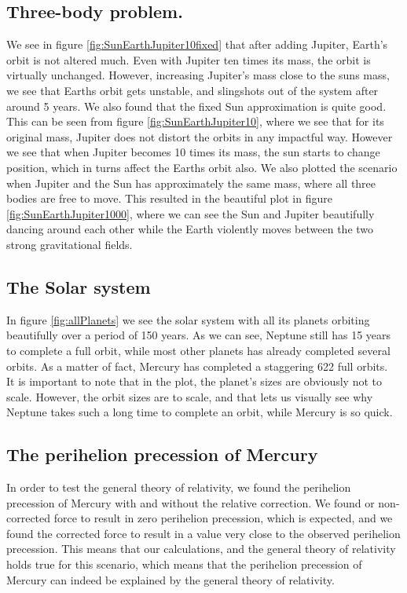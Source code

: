 \documentclass[../main.tex]{subfiles}
\begin{document}
\subsection{Three-body problem.}
We see in figure \ref{fig:SunEarthJupiter10fixed} that after adding Jupiter, Earth's orbit is not altered much. Even with Jupiter ten times its mass, the orbit is virtually unchanged. However, increasing Jupiter's mass close to the suns mass, we see that Earths orbit gets unstable, and slingshots out of the system after around 5 years.
We also found that the fixed Sun approximation is quite good. This can be seen from figure \ref{fig:SunEarthJupiter10}, where we see that for its original mass, Jupiter does not distort the orbits in any impactful way. However we see that when Jupiter becomes 10 times its mass, the sun starts to change position, which in turns affect the Earths orbit also. We also plotted the scenario when Jupiter and the Sun has approximately the same mass, where all three bodies are free to move. This resulted in the beautiful plot in figure \ref{fig:SunEarthJupiter1000}, where we can see the Sun and Jupiter beautifully dancing around each other while the Earth violently moves between the two strong gravitational fields.

\subsection{The Solar system}
In figure \ref{fig:allPlanets} we see the solar system with all its planets orbiting beautifully over a period of 150 years. As we can see, Neptune still has 15 years to complete a full orbit, while most other planets has already completed several orbits. As a matter of fact, Mercury has completed a staggering 622 full orbits. \\
It is important to note that in the plot, the planet's sizes are obviously not to scale. However, the orbit sizes are to scale, and that lets us visually see why Neptune takes such a long time to complete an orbit, while Mercury is so quick.
\iffalse
When making a simulation of the different planets in our Solar system, it would be strange if we did not look at the whole system together. The orbit of all the planets in The Solar system is plotted in figure \ref{fig:allPlanets}. As expected(studied in real life) they all move around the Sun in a somewhat circular/elliptical orbit during our simulation.
\fi

\subsection{The perihelion precession of Mercury}
In order to test the general theory of relativity, we found the perihelion precession of Mercury with and without the relative correction. We found or non-corrected force to result in zero perihelion precession, which is expected, and we found the corrected force to result in a value very close to the observed perihelion precession. This means that our calculations, and the general theory of relativity holds true for this scenario, which means that the perihelion precession of Mercury can indeed be explained by the general theory of relativity.
\end{document}
